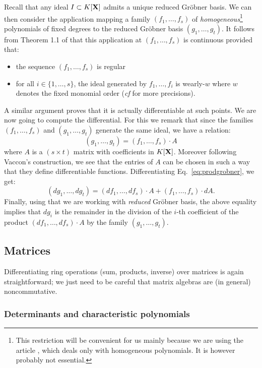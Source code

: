 \documentclass{lms}
\begin{document}
Recall that any 
ideal $I \subset K[\mathbf X]$ admits a unique reduced Gr\"obner basis. We can 
then consider the application mapping a family $(f_1, \ldots, f_s)$ of 
\emph{homogeneous}\footnote{This restriction will be convenient for us 
mainly because we are using the article \cite{Vaccon}, which deals only 
with homogeneous polynomials. It is however probably not essential.} 
polynomials of fixed degrees to the reduced Gr\"obner basis $(g_1, 
\ldots, g_t)$. It follows from Theorem 1.1 of \cite{Vaccon} that this 
application at $(f_1, \ldots, f_s)$ is continuous provided that:
\begin{itemize}
\item the sequence $(f_1, \ldots, f_s)$ is regular
\item for all $i \in \{1, \ldots, s\}$, the ideal generated by
$f_1, \ldots, f_i$ is wearly-$w$ where $w$ denotes the fixed monomial
order (\emph{cf} \cite{Vaccon} for more precisions).
\end{itemize}
A similar argument proves that it is actually differentiable at such
points. We are now going to compute the differential. For this we
remark that since the families $(f_1, \ldots, f_s)$ and $(g_1, \ldots,
g_t)$ generate the same ideal, we have a relation:
\begin{equation}
\label{eq:prodgrobner}
(g_1, \ldots, g_t) = (f_1, \ldots, f_s) \cdot A
\end{equation}
where $A$ is a $(s \times t)$ matrix with coefficients in $K[\mathbf X]$.
Moreover following Vaccon's construction, we see that the entries of $A$ 
can be chosen in such a way that they define differentiable functions.
Differentiating Eq.~\eqref{eq:prodgrobner}, we get:
$$(d g_1, \ldots, d g_t) =
(d f_1, \ldots, d f_s) \cdot A + (f_1, \ldots, f_s) \cdot dA.$$
Finally, using that we are working with \emph{reduced} Gr\"obner
basis, the above equality implies that $d g_i$ is the remainder in
the division of the $i$-th coefficient of the product
$(d f_1, \ldots, d f_s) \cdot A$ by the family $(g_1, \ldots, g_t)$.

\subsection{Matrices}

Differentiating ring operations (sum, products, inverse) over matrices 
is again straightforward; we just need to be careful that matrix 
algebras are (in general) noncommutative.

\subsubsection*{Determinants and characteristic polynomials}
\end{document}
